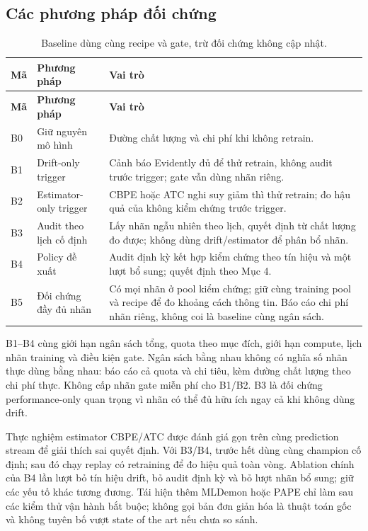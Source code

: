 \subsection{Các phương pháp đối chứng}
\begin{xltabular}{\linewidth}{@{}L{0.7cm} L{3.2cm} Y@{}}
\caption{Baseline dùng cùng recipe và gate, trừ đối chứng không cập nhật.}\label{tab:baselines}\\
\toprule\textbf{Mã} & \textbf{Phương pháp} & \textbf{Vai trò} \\
\midrule\endfirsthead
\toprule\textbf{Mã} & \textbf{Phương pháp} & \textbf{Vai trò} \\
\midrule\endhead
B0 & Giữ nguyên mô hình & Đường chất lượng và chi phí khi không retrain. \\
B1 & Drift-only trigger & Cảnh báo Evidently đủ để thử retrain, không audit trước trigger; gate vẫn dùng nhãn riêng. \\
B2 & Estimator-only trigger & CBPE hoặc ATC nghi suy giảm thì thử retrain; đo hậu quả của không kiểm chứng trước trigger. \\
B3 & Audit theo lịch cố định & Lấy nhãn ngẫu nhiên theo lịch, quyết định từ chất lượng đo được; không dùng drift/estimator để phân bổ nhãn. \\
B4 & Policy đề xuất & Audit định kỳ kết hợp kiểm chứng theo tín hiệu và một lượt bổ sung; quyết định theo Mục 4. \\
B5 & Đối chứng đầy đủ nhãn & Có mọi nhãn ở pool kiểm chứng; giữ cùng training pool và recipe để đo khoảng cách thông tin. Báo cáo chi phí nhãn riêng, không coi là baseline cùng ngân sách. \\
\bottomrule
\end{xltabular}
B1--B4 cùng giới hạn ngân sách tổng, quota theo mục đích, giới hạn compute, lịch nhãn training và điều kiện gate. Ngân sách bằng nhau không có nghĩa số nhãn thực dùng bằng nhau: báo cáo cả quota và chi tiêu, kèm đường chất lượng theo chi phí thực. Không cấp nhãn gate miễn phí cho B1/B2. B3 là đối chứng performance-only quan trọng vì nhãn có thể đủ hữu ích ngay cả khi không dùng drift.

Thực nghiệm estimator CBPE/ATC được đánh giá gọn trên cùng prediction stream để giải thích sai quyết định. Với B3/B4, trước hết dùng cùng champion cố định; sau đó chạy replay có retraining để đo hiệu quả toàn vòng. Ablation chính của B4 lần lượt bỏ tín hiệu drift, bỏ audit định kỳ và bỏ lượt nhãn bổ sung; giữ các yếu tố khác tương đương. Tái hiện thêm MLDemon hoặc PAPE chỉ làm sau các kiểm thử vận hành bắt buộc; không gọi bản đơn giản hóa là thuật toán gốc và không tuyên bố vượt state of the art nếu chưa so sánh.

